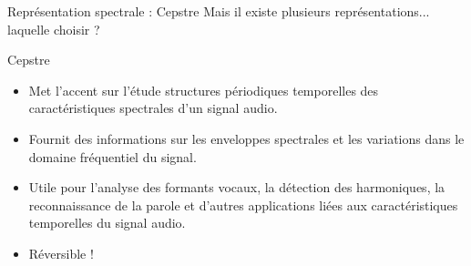 \documentclass[compress,xcolor=table]{beamer}
\begin{document}
\begin{frame}{Représentation spectrale : Cepstre}
    Mais il existe plusieurs représentations... laquelle choisir ?

    \begin{block}{Cepstre}

        \begin{itemize}
            \item Met l'accent sur l'étude structures périodiques temporelles des caractéristiques spectrales d'un signal audio.
            \item Fournit des informations sur les enveloppes spectrales et les variations dans le domaine fréquentiel du signal.
            \item Utile pour l'analyse des formants vocaux, la détection des harmoniques, la reconnaissance de la parole et d'autres applications liées aux caractéristiques temporelles du signal audio.
            \item Réversible !
        \end{itemize}

    \end{block}

\end{frame}
\end{document}

